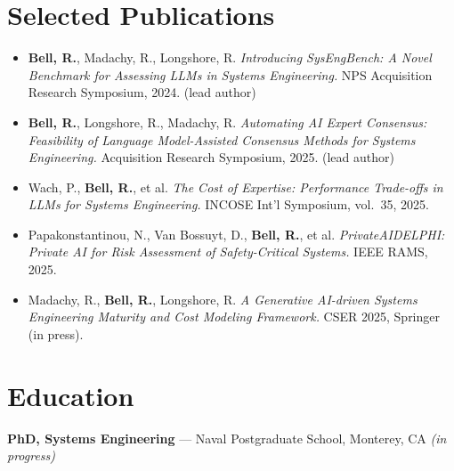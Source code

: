 \documentclass[10pt,letterpaper]{article}
\begin{document}
\section{Selected Publications}
\begin{itemize}
  \item \textbf{Bell, R.}, Madachy, R., Longshore, R. \textit{Introducing SysEngBench: A Novel
        Benchmark for Assessing LLMs in Systems Engineering.} NPS Acquisition Research
        Symposium, 2024. (lead author)
  \item \textbf{Bell, R.}, Longshore, R., Madachy, R. \textit{Automating AI Expert Consensus:
        Feasibility of Language Model-Assisted Consensus Methods for Systems Engineering.}
        Acquisition Research Symposium, 2025. (lead author)
  \item Wach, P., \textbf{Bell, R.}, et al. \textit{The Cost of Expertise: Performance Trade-offs
        in LLMs for Systems Engineering.} INCOSE Int'l Symposium, vol.~35, 2025.
  \item Papakonstantinou, N., Van Bossuyt, D., \textbf{Bell, R.}, et al. \textit{PrivateAIDELPHI:
        Private AI for Risk Assessment of Safety-Critical Systems.} IEEE RAMS, 2025.
  \item Madachy, R., \textbf{Bell, R.}, Longshore, R. \textit{A Generative AI-driven Systems
        Engineering Maturity and Cost Modeling Framework.} CSER 2025, Springer (in press).
\end{itemize}

\section{Education}
\textbf{PhD, Systems Engineering} --- Naval Postgraduate School, Monterey, CA \textit{(in progress)}
\end{document}

